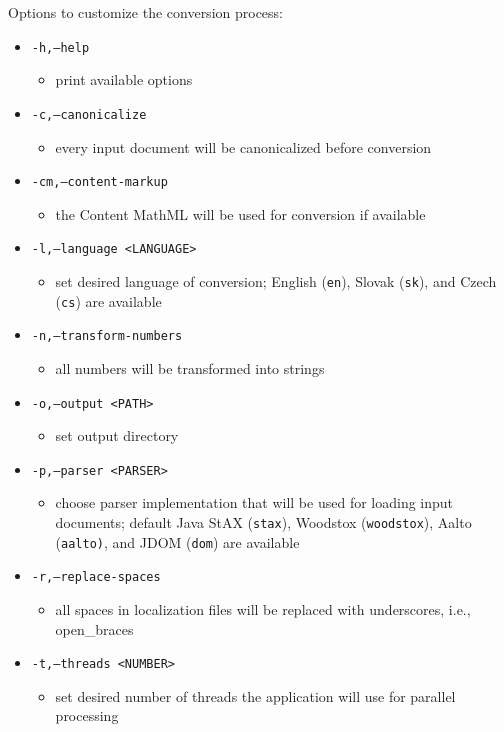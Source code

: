\documentclass[11pt,oneside,final]{fithesis2}
\begin{document}
Options to customize the conversion process:
\begin{itemize}
\item \texttt{-h,--help}
	\begin{itemize}
	\item print available options
	\end{itemize}
\item \texttt{-c,--canonicalize}
	\begin{itemize}
	\item every input document will be canonicalized before conversion
	\end{itemize}
\item \texttt{-cm,--content-markup}
	\begin{itemize}
	\item the Content MathML will be used for conversion if available
	\end{itemize}
\item \texttt{-l,--language <LANGUAGE>}
	\begin{itemize}
	\item set desired language of conversion; English (\texttt{en}), Slovak (\texttt{sk}), and Czech (\texttt{cs}) are available
	\end{itemize}
\item \texttt{-n,--transform-numbers}
	\begin{itemize}
	\item all numbers will be transformed into strings
	\end{itemize}
\item \texttt{-o,--output <PATH>}
	\begin{itemize}
	\item set output directory
	\end{itemize}
\item \texttt{-p,--parser <PARSER>}
	\begin{itemize}
	\item choose parser implementation that will be used for loading input documents; default Java StAX (\texttt{stax}), Woodstox (\texttt{woodstox}), Aalto (\texttt{aalto)}, and JDOM (\texttt{dom}) are available
	\end{itemize}
\item \texttt{-r,--replace-spaces}
	\begin{itemize}
	\item all spaces in localization files will be replaced with underscores, i.e., open\_braces 
	\end{itemize}
\item \texttt{-t,--threads <NUMBER>}
	\begin{itemize}
	\item set desired number of threads the application will use for parallel processing
	\end{itemize}
\end{itemize}
\end{document}
